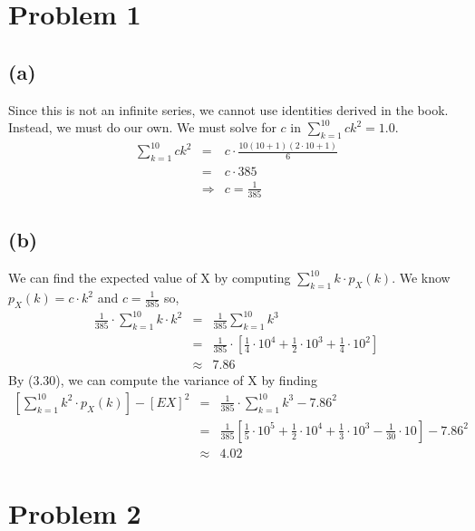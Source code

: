 \documentclass{article}
\begin{document}
\thispagestyle{fancy}

\section*{Problem 1} 

\subsection*{(a)}

Since this is not an infinite series, we cannot use identities derived in the
book. Instead, we must do our own. We must solve for $c$ in
$\displaystyle\sum\limits_{k=1}^{10} ck^2 = 1.0$.
\begin{eqnarray*}
  \sum\limits_{k=1}^{10} ck^2 &=& c \cdot \frac{10(10 + 1)(2\cdot10+1)}{6} \\
  &=& c\cdot 385 \\
  &\Rightarrow& c = \frac{1}{385}
\end{eqnarray*}

\subsection*{(b)}

We can find the expected value of X by computing $\sum\limits_{k=1}^{10} k\cdot
p_{X}(k)$. We know $p_{X}(k) = c\cdot k^2$ and $c = \frac{1}{385}$ so,
\begin{eqnarray*}
  \frac{1}{385}\cdot\sum\limits_{k=1}^{10} k\cdot k^2 &=& \frac{1}{385}
  \sum\limits_{k=1}^{10} k^3 \\
  &=& \frac{1}{385} \cdot \left[ \frac{1}{4}\cdot10^4 + \frac{1}{2}\cdot10^3 +
  \frac{1}{4}\cdot10^2\right] \\
  &\approx& 7.86
\end{eqnarray*}
By (3.30), we can compute the variance of X by finding
\begin{eqnarray*}
  \left[\sum\limits_{k=1}^{10} k^2\cdot p_{X}(k) \right] - [EX]^2 &=&
  \frac{1}{385}\cdot \sum\limits_{k=1}^{10} k^3 - 7.86^2 \\
  &=& \frac{1}{385}\left[ \frac{1}{5}\cdot10^5 + \frac{1}{2}\cdot10^4 +
  \frac{1}{3}\cdot10^3 - \frac{1}{30}\cdot10\right] - 7.86^2 \\
  &\approx& 4.02
\end{eqnarray*}

\section*{Problem 2}
\end{document}
